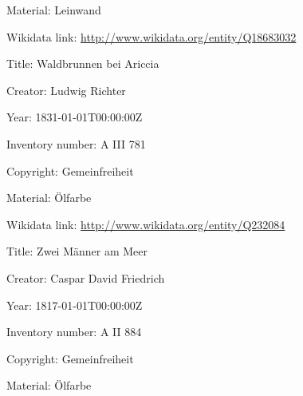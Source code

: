 \documentclass[
  letterpaper,
  DIV=11,
  numbers=noendperiod]{scrartcl}
\begin{document}
Material: Leinwand

Wikidata link: \url{http://www.wikidata.org/entity/Q18683032}

Title: Waldbrunnen bei Ariccia

Creator: Ludwig Richter

Year: 1831-01-01T00:00:00Z

Inventory number: A III 781

Copyright: Gemeinfreiheit

Material: Ölfarbe

Wikidata link: \url{http://www.wikidata.org/entity/Q232084}

Title: Zwei Männer am Meer

Creator: Caspar David Friedrich

Year: 1817-01-01T00:00:00Z

Inventory number: A II 884

Copyright: Gemeinfreiheit

Material: Ölfarbe
\end{document}
